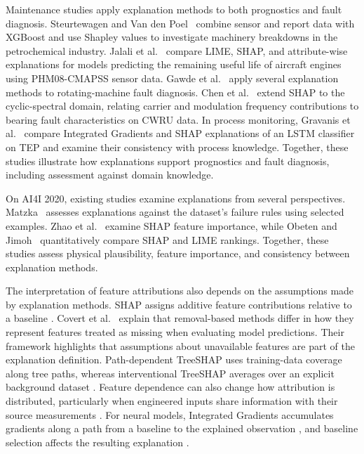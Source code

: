 \documentclass[conference]{IEEEtran}
\begin{document}
Maintenance studies apply explanation methods to both prognostics and fault diagnosis. Steurtewagen and Van den Poel~\cite{steurtewagen2021adding} combine sensor and report data with XGBoost and use Shapley values to investigate machinery breakdowns in the petrochemical industry. Jalali et al.~\cite{jalali2020interpretability} compare LIME, SHAP, and attribute-wise explanations for models predicting the remaining useful life of aircraft engines using PHM08-CMAPSS sensor data. Gawde et al.~\cite{gawde2024explainable} apply several explanation methods to rotating-machine fault diagnosis. Chen et al.~\cite{chen2025csshap} extend SHAP to the cyclic-spectral domain, relating carrier and modulation frequency contributions to bearing fault characteristics on CWRU data. In process monitoring, Gravanis et al.~\cite{gravanis2026explainability} compare Integrated Gradients and SHAP explanations of an LSTM classifier on TEP and examine their consistency with process knowledge. Together, these studies illustrate how explanations support prognostics and fault diagnosis, including assessment against domain knowledge.

On AI4I 2020, existing studies examine explanations from several perspectives. Matzka~\cite{matzka2020explainable} assesses explanations against the dataset's failure rules using selected examples. Zhao et al.~\cite{milling2025shap} examine SHAP feature importance, while Obeten and Jimoh~\cite{obeten2026agreement} quantitatively compare SHAP and LIME rankings. Together, these studies assess physical plausibility, feature importance, and consistency between explanation methods.

The interpretation of feature attributions also depends on the assumptions made by explanation methods. SHAP assigns additive feature contributions relative to a baseline \cite{lundberg2017shap}. Covert et al.~\cite{covert2021explaining} explain that removal-based methods differ in how they represent features treated as missing when evaluating model predictions. Their framework highlights that assumptions about unavailable features are part of the explanation definition. Path-dependent TreeSHAP uses training-data coverage along tree paths, whereas interventional TreeSHAP averages over an explicit background dataset \cite{lundberg2020treeshap}. Feature dependence can also change how attribution is distributed, particularly when engineered inputs share information with their source measurements \cite{chen2020true,aas2021explaining}. For neural models, Integrated Gradients accumulates gradients along a path from a baseline to the explained observation \cite{sundararajan2017axiomatic}, and baseline selection affects the resulting explanation \cite{sturmfels2020visualizing}.
\end{document}
